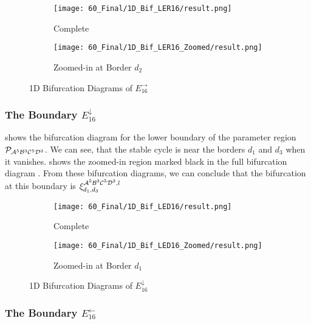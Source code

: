 \begin{figure}
    \centering
    \begin{subfigure}{0.4\textwidth}
        \centering
        \texttt{[image: 60\_Final/1D\_Bif\_LER16/result.png]}
        \caption{Complete}
        \label{fig:final.bifurcation.E.right}
    \end{subfigure}
    \begin{subfigure}{0.4\textwidth}
        \centering
        \texttt{[image: 60\_Final/1D\_Bif\_LER16\_Zoomed/result.png]}
        \caption{Zoomed-in at Border $d_2$}
        \label{fig:final.bifurcation.E.right.zoomed}
    \end{subfigure}
    \caption{1D Bifurcation Diagrams of $E_{16}^\rightarrow$}
\end{figure}

\subsubsection{The Boundary $E_{16}^\downarrow$}

 shows the bifurcation diagram for the lower boundary of the parameter region $\mathcal{P}_{\mathcal{A}^5\mathcal{B}^3\mathcal{C}^5\mathcal{D}^3}$.
We can see, that the stable cycle is near the borders $d_1$ and $d_3$ when it vanishes.
 shows the zoomed-in region marked black in the full bifurcation diagram .
From these bifurcation diagrams, we can conclude that the bifurcation at this boundary is $\xi_{d_1, d_3}^{\mathcal{A}^5\mathcal{B}^3\mathcal{C}^5\mathcal{D}^3, l}$

\begin{figure}
    \centering
    \begin{subfigure}{0.4\textwidth}
        \centering
        \texttt{[image: 60\_Final/1D\_Bif\_LED16/result.png]}
        \caption{Complete}
        \label{fig:final.bifurcation.E.down}
    \end{subfigure}
    \begin{subfigure}{0.4\textwidth}
        \centering
        \texttt{[image: 60\_Final/1D\_Bif\_LED16\_Zoomed/result.png]}
        \caption{Zoomed-in at Border $d_1$}
        \label{fig:final.bifurcation.E.down.zoomed}
    \end{subfigure}
    \caption{1D Bifurcation Diagrams of $E_{16}^\downarrow$}
\end{figure}

\subsubsection{The Boundary $E_{16}^\leftarrow$}

